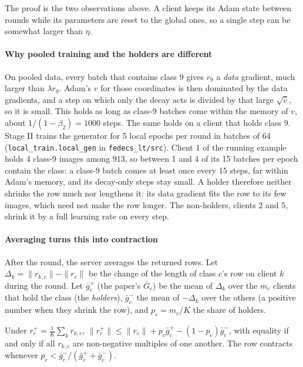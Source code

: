 The proof is the two observations above. A client keeps its Adam state between rounds while its parameters are reset
to the global ones, so a single step can be somewhat larger than $\eta$.

\paragraph{Why pooled training and the holders are different} On pooled data, every batch that contains class 9
gives $r_9$ a \emph{data} gradient, much larger than $\lambda r_9$. Adam's $v$ for those coordinates is then dominated
by the data gradients, and a step on which only the decay acts is divided by that large $\sqrt{\hat v}$, so it is
small. This holds as long as class-9 batches come within the memory of $v$, about $1/(1-\beta_2)=1000$ steps. The same
holds on a client that holds class 9. Stage II trains the generator for 5 local epochs per round in batches of 64
(\texttt{local\_train.local\_gen} in \texttt{fedecs\_lt/src}). Client 1 of the running example holds 4 class-9 images
among 913, so between 1 and 4 of its 15 batches per epoch contain the class: a class-9 batch comes at least once every 15 steps, far within Adam's memory, and its decay-only steps stay small. A holder therefore neither shrinks the row much nor
lengthens it: its data gradient fits the row to its few images, which need not make the row longer. The non-holders,
clients 2 and 5, shrink it by a full learning rate on every step.

\paragraph{Averaging turns this into contraction} After the round, the server averages the returned rows. Let
$\Delta_k=\|r_{k,c}\|-\|r_c\|$ be the change of the length of class $c$'s row on client $k$ during the round. Let
$\bar g^{+}_c$ (the paper's $\bar G_c$) be the mean of $\Delta_k$ over the $m_c$ clients that hold the class (the \emph{holders}), $\bar g^{-}_c$ the
mean of $-\Delta_k$ over the others (a positive number when they shrink the row), and $p_c=m_c/K$ the share of holders.

\begin{lemma*}
Under $r_c^+=\frac1K\sum_k r_{k,c}$, $\|r_c^+\|\le\|r_c\|+p_c\bar g^{+}_c-(1-p_c)\bar g^{-}_c$, with equality if and only if all
$r_{k,c}$ are non-negative multiples of one another. The row contracts whenever $p_c<\bar g^{-}_c/(\bar g^{+}_c+\bar g^{-}_c)$.
\end{lemma*}

